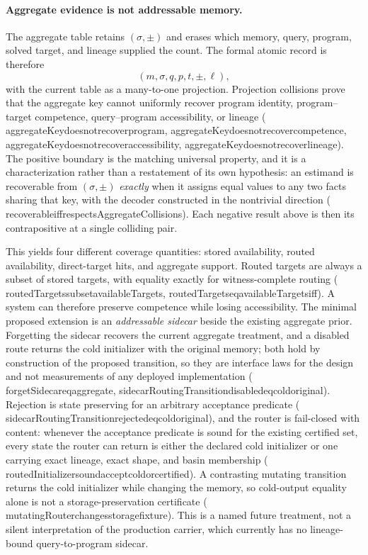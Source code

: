 \documentclass[11pt]{article}
\newcommand{\leanname}[1]{{\scriptsize\ttfamily
  \def\_{\textunderscore\allowbreak}#1}}
\begin{document}
\paragraph{Aggregate evidence is not addressable memory.}
The aggregate table retains $(\sigma,\pm)$ and erases which memory, query, program,
solved target, and lineage supplied the count.  The formal atomic record is therefore
\[
  (m,\sigma,q,p,t,\pm,\ell),
\]
with the current table as a many-to-one projection.  Projection collisions prove that
the aggregate key cannot uniformly recover program identity, program--target
competence, query--program accessibility, or lineage
(\leanname{aggregateKey\_does\_not\_recover\_program},
\leanname{aggregateKey\_does\_not\_recover\_competence},
\leanname{aggregateKey\_does\_not\_recover\_accessibility},
\leanname{aggregateKey\_does\_not\_recover\_lineage}).  The positive boundary is the
matching universal property, and it is a characterization rather than a restatement of
its own hypothesis: an estimand is recoverable from $(\sigma,\pm)$ \emph{exactly} when it
assigns equal values to any two facts sharing that key, with the decoder constructed in
the nontrivial direction
(\leanname{recoverable\_iff\_respectsAggregateCollisions}).  Each negative result above is
then its contrapositive at a single colliding pair.

This yields four different coverage quantities: stored availability, routed
availability, direct-target hits, and aggregate support.  Routed targets are always a
subset of stored targets, with equality exactly for witness-complete routing
(\leanname{routedTargets\_subset\_availableTargets},
\leanname{routedTargets\_eq\_availableTargets\_iff}).  A system can therefore preserve
competence while losing accessibility.  The minimal proposed extension is an
\emph{addressable sidecar} beside the existing aggregate prior.  Forgetting the sidecar
recovers the current aggregate treatment, and a disabled route returns the cold
initializer with the original memory; both hold by construction of the proposed
transition, so they are interface laws for the design and not measurements of any
deployed implementation
(\leanname{forgetSidecar\_eq\_aggregate},
\leanname{sidecarRoutingTransition\_disabled\_eq\_cold\_original}).  Rejection is state
preserving for an arbitrary acceptance predicate
(\leanname{sidecarRoutingTransition\_rejected\_eq\_cold\_original}), and the router is
fail-closed with content: whenever the acceptance predicate is sound for the existing
certified set, every state the router can return is either the declared cold initializer
or one carrying exact lineage, exact shape, and basin membership
(\leanname{routedInitializer\_sound\_accept\_cold\_or\_certified}).  A contrasting
mutating transition returns the cold initializer while changing the memory, so
cold-output equality alone is not a storage-preservation certificate
(\leanname{mutatingRouter\_changes\_storage\_fixture}).  This is a named future
treatment, not a silent interpretation of the production carrier, which currently has
no lineage-bound query-to-program sidecar.
\end{document}
